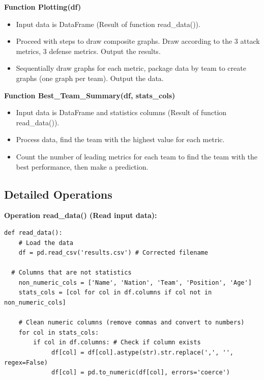 \documentclass[12pt]{report}
\begin{document}
{{\textbf* {Function Plotting(df)} %
\begin{itemize}
	\item Input data is DataFrame (Result of function read\_data()).
	\item Proceed with steps to draw composite graphs. Draw according to the 3 attack metrics, 3 defense metrics. Output the results.
	\item Sequentially draw graphs for each metric, package data by team to create graphs (one graph per team). Output the data.
\end{itemize}

\textbf* {Function Best\_Team\_Summary(df, stats\_cols)} %
\begin{itemize}
	\item Input data is DataFrame and statistics columns (Result of function read\_data()).
	\item Process data, find the team with the highest value for each metric.
	\item Count the number of leading metrics for each team to find the team with the best performance, then make a prediction.
\end{itemize}

\subsection{Detailed Operations} %
\textbf* {Operation read\_data() (Read input data):} %
\begin{lstlisting}
def read_data():
    # Load the data
    df = pd.read_csv('results.csv') # Corrected filename

  # Columns that are not statistics
    non_numeric_cols = ['Name', 'Nation', 'Team', 'Position', 'Age']
    stats_cols = [col for col in df.columns if col not in non_numeric_cols]

    # Clean numeric columns (remove commas and convert to numbers)
    for col in stats_cols:
        if col in df.columns: # Check if column exists
             df[col] = df[col].astype(str).str.replace(',', '', regex=False)
             df[col] = pd.to_numeric(df[col], errors='coerce')


\end{lstlisting}}}
\end{document}
